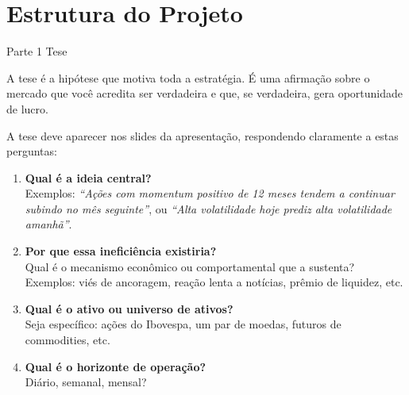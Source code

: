 \documentclass[11pt,a4paper]{article}
\begin{document}
\newpage

\section{Estrutura do Projeto}

\begin{stepbox}{Parte 1 \quad Tese}

A tese \'e a hip\'otese que motiva toda a estrat\'egia.
\'E uma afirma\c{c}\~ao sobre o mercado que voc\^e acredita ser verdadeira
e que, se verdadeira, gera oportunidade de lucro.

\vspace{0.4em}
A tese deve aparecer nos slides da apresenta\c{c}\~ao,
respondendo claramente a estas perguntas:

\begin{enumerate}
  \item \textbf{Qual \'e a ideia central?}\\
        Exemplos: \emph{``A\c{c}\~oes com momentum positivo de 12 meses
        tendem a continuar subindo no m\^es seguinte''},
        ou \emph{``Alta volatilidade hoje prediz alta volatilidade amanh\~a''}.

  \item \textbf{Por que essa inefici\^encia existiria?}\\
        Qual \'e o mecanismo econ\^omico ou comportamental que a sustenta?
        Exemplos: viés de ancoragem, reação lenta a notícias,
        prêmio de liquidez, etc.

  \item \textbf{Qual \'e o ativo ou universo de ativos?}\\
        Seja específico: ações do Ibovespa, um par de moedas,
        futuros de commodities, etc.

  \item \textbf{Qual \'e o horizonte de opera\c{c}\~ao?}\\
        Di\'ario, semanal, mensal?
\end{enumerate}
\end{stepbox}

\vspace{1em}
\end{document}
